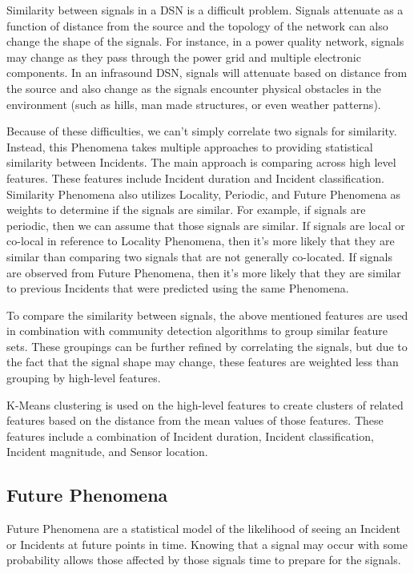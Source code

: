 Similarity between signals in a DSN is a difficult problem. Signals attenuate as a function of distance from the source and the topology of the network can also change the shape of the signals. For instance, in a power quality network, signals may change as they pass through the power grid and multiple electronic components. In an infrasound DSN, signals will attenuate based on distance from the source and also change as the signals encounter physical obstacles in the environment (such as hills, man made structures, or even weather patterns).

Because of these difficulties, we can't simply correlate two signals for similarity. Instead, this Phenomena takes multiple approaches to providing statistical similarity between Incidents. The main approach is comparing across high level features. These features include Incident duration and Incident classification. Similarity Phenomena also utilizes Locality, Periodic, and Future Phenomena as weights to determine if the signals are similar. For example, if signals are periodic, then we can assume that those signals are similar. If signals are local or co-local in reference to Locality Phenomena, then it's more likely that they are similar than comparing two signals that are not generally co-located. If signals are observed from Future Phenomena, then it's more likely that they are similar to previous Incidents that were predicted using the same Phenomena.

To compare the similarity between signals, the above mentioned features are used in combination with community detection algorithms to group similar feature sets. These groupings can be further refined by correlating the signals, but due to the fact that the signal shape may change, these features are weighted less than grouping by high-level features.

K-Means clustering is used on the high-level features to create clusters of related features based on the distance from the mean values of those features. These features include a combination of Incident duration, Incident classification, Incident magnitude, and Sensor location.

\subsection{Future Phenomena}\label{subsec:future-phenomena}
Future Phenomena are a statistical model of the likelihood of seeing an Incident or Incidents at future points in time. Knowing that a signal may occur with some probability allows those affected by those signals time to prepare for the signals.

